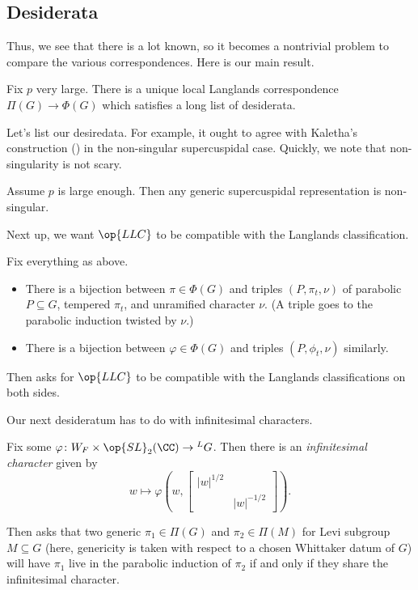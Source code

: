 \documentclass{article}
\begin{document}
\subsection{Desiderata}
Thus, we see that there is a lot known, so it becomes a nontrivial problem to compare the various correspondences. Here is our main result.
\begin{theorem} \label{thm:main-llc}
	Fix $p$ very large. There is a unique local Langlands correspondence $\Pi(G)\to\Phi(G)$ which satisfies a long list of desiderata.
\end{theorem}
Let's list our desiredata. For example, it ought to agree with Kaletha's construction () in the non-singular supercuspidal case. Quickly, we note that non-singularity is not scary.
\begin{theorem}
	Assume $p$ is large enough. Then any generic supercuspidal representation is non-singular.
\end{theorem}
Next up, we want $\op{LLC}$ to be compatible with the Langlands classification.
\begin{theorem}
	Fix everything as above.
	\begin{itemize}
		\item There is a bijection between $\pi\in\Phi(G)$ and triples $(P,\pi_t,\nu)$ of parabolic $P\subseteq G$, tempered $\pi_t$, and unramified character $\nu$.  (A triple goes to the parabolic induction twisted by $\nu$.)
		\item There is a bijection between $\varphi\in\Phi(G)$ and triples $(P,\phi_t,\nu)$ similarly.
	\end{itemize}
\end{theorem}
Then  asks for $\op{LLC}$ to be compatible with the Langlands classifications on both sides.

Our next desideratum has to do with infinitesimal characters.
\begin{definition}
	Fix some $\varphi\colon W_F\times\op{SL}_2(\CC)\to{}^LG$. Then there is an \textit{infinitesimal character} given by
	\[w\mapsto\varphi\left(w,\begin{bmatrix}
		\left|w\right|^{1/2} \\ & \left|w\right|^{-1/2}
	\end{bmatrix}\right).\]
\end{definition}
Then  asks that two generic $\pi_1\in\Pi(G)$ and $\pi_2\in\Pi(M)$ for Levi subgroup $M\subseteq G$ (here, genericity is taken with respect to a chosen Whittaker datum of $G$) will have $\pi_1$ live in the parabolic induction of $\pi_2$ if and only if they share the infinitesimal character.
\end{document}
